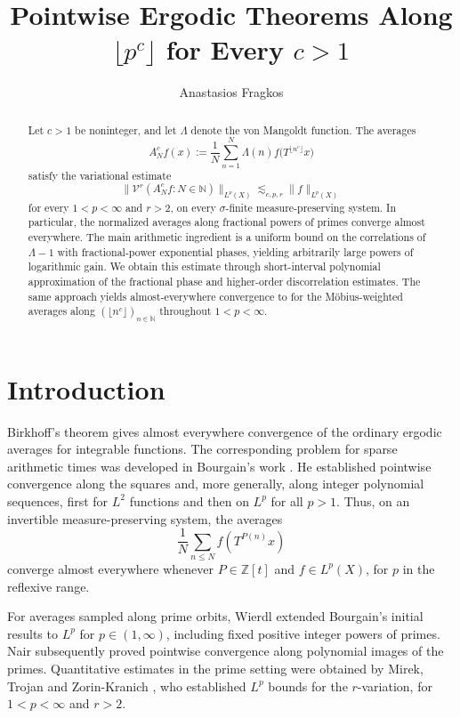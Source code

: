 \documentclass[10pt,leqno]{amsart}
\title{Pointwise Ergodic Theorems Along $\lfloor p^c\rfloor$ for Every $c>1$
}
\author[A. Fragkos]{Anastasios Fragkos}
\def\N {\mathbb{N}}
\numberwithin{equation}{section}
\numberwithin{counter2}{section}
\theoremstyle{definition}
\theoremstyle{plain}
\newcommand{\floor}[1]{\lfloor #1 \rfloor}
\begin{document}
	\begin{abstract}
	    Let $c>1$ be noninteger, and let $\Lambda$ denote the von Mangoldt function. The averages
\[
A_N^{c} f(x):=\frac1N\sum_{n=1}^{N}
\Lambda(n)f\bigl(T^{\lfloor n^c\rfloor}x\bigr)
\]
satisfy the variational estimate
\[
\bigl\|\mathcal{V}^r(A_N^{c} f:N\in\mathbb{N})\bigr\|_{L^p(X)}
\lesssim_{c,p,r}\|f\|_{L^p(X)}
\]
for every $1<p<\infty$ and $r>2$, on every
$\sigma$-finite measure-preserving system. In particular, the
normalized averages along fractional powers of primes converge
almost everywhere. The main arithmetic ingredient is a uniform bound on the correlations of $\Lambda-1$ with fractional-power exponential phases, yielding arbitrarily  large powers of logarithmic gain. We obtain this estimate through
short-interval polynomial approximation of the fractional phase and higher-order discorrelation estimates. The same approach yields
almost-everywhere convergence to for the
M\"obius-weighted averages along $\left( \floor{n^c} \right)_{n \in \N}$ throughout $1<p<\infty$.
	\end{abstract}
	\maketitle
	\section{Introduction}
	
	Birkhoff's theorem \cite{Birkhoff1931} gives almost everywhere
	convergence of the ordinary ergodic averages for integrable
	functions. The corresponding problem for sparse arithmetic times
	was developed in Bourgain's work
	\cite{Bourgain1988Maximal,Bourgain1988Lp,Bourgain1989}. He established
	pointwise convergence along the squares and, more generally, along
	integer polynomial sequences, first for $L^2$ functions and then
	on $L^p$ for all $p>1$. Thus, on an invertible
	measure-preserving system, the averages
	\[\frac{1}{N}\sum_{n\le N}f(T^{P(n)}x)\] converge almost everywhere whenever
	$P\in\mathbb Z[t]$ and $f\in L^p(X)$, for $p$ in the reflexive range.
	
	
	
	For averages sampled along prime orbits, Wierdl \cite{Wierdl1988} extended
	Bourgain's initial results to $L^p$ for $p \in (1,\infty)$, including
	fixed positive integer powers of primes. Nair \cite{Nair1993}
	subsequently proved pointwise convergence along polynomial images
	of the primes. Quantitative estimates in the prime setting were
	obtained by Mirek, Trojan and Zorin-Kranich \cite{MTZK2017}, who
	established $L^p$ bounds for the $r$-variation,
	for $ 1<p<\infty$ and $r>2$.
	
\end{document}
